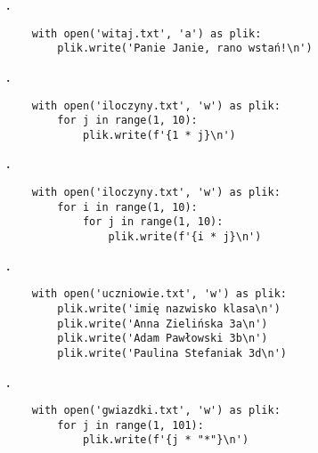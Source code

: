 \documentclass[a4paper]{article}
\begin{document}
\textbf{.}\addtocounter{zadanie}{1}
   \lstset{numbers=none}
   \begin{lstlisting}
    with open('witaj.txt', 'a') as plik:
        plik.write('Panie Janie, rano wstań!\n')
    \end{lstlisting}

\textbf{.}\addtocounter{zadanie}{1}
   \lstset{numbers=none}
   \begin{lstlisting}
    with open('iloczyny.txt', 'w') as plik:
        for j in range(1, 10):
            plik.write(f'{1 * j}\n')
    \end{lstlisting}

\textbf{.}\addtocounter{zadanie}{1}
   \lstset{numbers=none}
   \begin{lstlisting}
    with open('iloczyny.txt', 'w') as plik:
        for i in range(1, 10):
            for j in range(1, 10):
                plik.write(f'{i * j}\n')
    \end{lstlisting}

\textbf{.}\addtocounter{zadanie}{1}
   \lstset{numbers=none}
   \begin{lstlisting}
    with open('uczniowie.txt', 'w') as plik:
        plik.write('imię nazwisko klasa\n')
        plik.write('Anna Zielińska 3a\n')
        plik.write('Adam Pawłowski 3b\n')
        plik.write('Paulina Stefaniak 3d\n')
   \end{lstlisting}

\textbf{.}\addtocounter{zadanie}{1}
   \lstset{numbers=none}
   \begin{lstlisting}
    with open('gwiazdki.txt', 'w') as plik:
        for j in range(1, 101):
            plik.write(f'{j * "*"}\n')
   \end{lstlisting}
\end{document}
